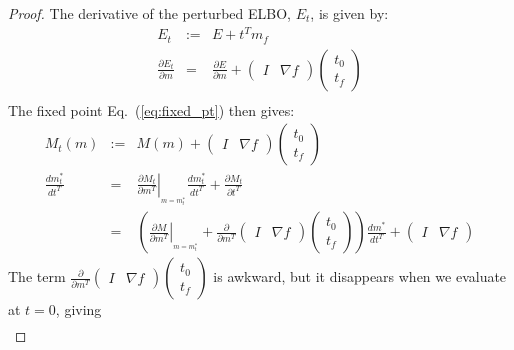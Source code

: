 \documentclass{article}\usepackage[]{graphicx}\usepackage[]{color}
\newcommand{\eq}[1]{Eq.~(\ref{eq:#1})}
\theoremstyle{plain}
\begin{document}
\begin{proof}
  The derivative of the perturbed ELBO, $E_t$, is given by:
  \begin{eqnarray*}
  E_{t} & := & E+t^{T}m_{f}\\
  \frac{\partial E_{t}}{\partial m} & = &
  \frac{\partial E}{\partial m}+\left(\begin{array}{cc}
  I & \nabla f\end{array}\right)\left(\begin{array}{c}
  t_{0}\\
  t_{f}
  \end{array}\right)\\
  \end{eqnarray*}
  The fixed point \eq{fixed_pt} then gives:
  \begin{eqnarray*}
  M_{t}\left(m\right) & := & M\left(m\right)+\left(\begin{array}{cc}
  I & \nabla f\end{array}\right)\left(\begin{array}{c}
  t_{0}\\
  t_{f}
  \end{array}\right)\\
  \frac{dm_{t}^{*}}{dt^{T}} & = &
    \left.\frac{\partial M_{t}}{\partial m^{T}}\right|_{_{m=m_{t}^{*}}}
    \frac{dm_{t}^{*}}{dt^{T}}+\frac{\partial M_{t}}{\partial t^{T}}\\
   & = & \left(\left.\frac{\partial M}{\partial m^{T}}\right|_{_{m=m_{t}^{*}}}+
   \frac{\partial}{\partial m^{T}}\left(\begin{array}{cc}
  I & \nabla f\end{array}\right)\left(\begin{array}{c}
  t_{0}\\
  t_{f}
  \end{array}\right)\right)\frac{dm^{*}}{dt^{T}}+\left(\begin{array}{cc}
  I & \nabla f\end{array}\right)
  \end{eqnarray*}
  The term $\frac{\partial}{\partial m^{T}}\left(\begin{array}{cc}
  I & \nabla f\end{array}\right)\left(\begin{array}{c}
  t_{0}\\
  t_{f}
  \end{array}\right)$ is awkward, but it disappears when we evaluate at $t=0$,
  giving
  \begin{eqnarray*}

\end{eqnarray*}
\end{proof}
\end{document}
